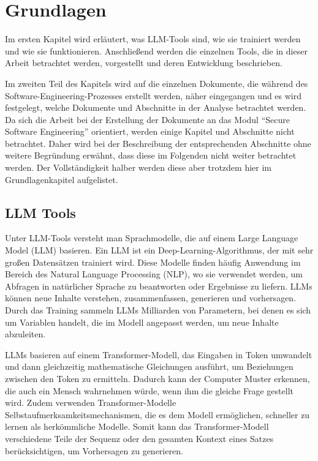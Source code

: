 
\chapter{Grundlagen} 

Im ersten Kapitel wird erläutert, was LLM-Tools sind, wie sie trainiert werden und wie sie funktionieren. 
Anschließend werden die einzelnen Tools, die in dieser Arbeit betrachtet werden, vorgestellt und deren 
Entwicklung beschrieben.

Im zweiten Teil des Kapitels wird auf die einzelnen Dokumente, die während des Software-Engineering-Prozesses 
erstellt werden, näher eingegangen und es wird festgelegt, welche Dokumente und Abschnitte in der Analyse betrachtet 
werden. Da sich die Arbeit bei der Erstellung der Dokumente an das Modul ``Secure Software Engineering'' orientiert, 
werden einige Kapitel und Abschnitte nicht betrachtet. Daher wird bei der Beschreibung der entsprechenden Abschnitte ohne 
weitere Begründung erwähnt, dass diese im Folgenden nicht weiter betrachtet werden. Der Vollständigkeit halber werden 
diese aber trotzdem hier im Grundlagenkapitel aufgelistet.

\section{LLM Tools}  \label{LLM Tools}

Unter LLM-Tools versteht man Sprachmodelle, die auf einem Large Language Model (LLM) basieren. Ein LLM ist ein 
Deep-Learning-Algorithmus, der mit sehr großen Datensätzen trainiert wird. Diese Modelle finden häufig Anwendung 
im Bereich des Natural Language Processing (NLP), wo sie verwendet werden, um Abfragen in natürlicher Sprache zu 
beantworten oder Ergebnisse zu liefern. LLMs können neue Inhalte verstehen, zusammenfassen, generieren und vorhersagen. 
Durch das Training sammeln LLMs Milliarden von Parametern, bei denen es sich um Variablen handelt, die im Modell angepasst 
werden, um neue Inhalte abzuleiten.

LLMs basieren auf einem Transformer-Modell, das Eingaben in Token umwandelt und dann gleichzeitig mathematische 
Gleichungen ausführt, um Beziehungen zwischen den Token zu ermitteln. Dadurch kann der Computer Muster erkennen, 
die auch ein Mensch wahrnehmen würde, wenn ihm die gleiche Frage gestellt wird. Zudem verwenden Transformer-Modelle 
Selbstaufmerksamkeitsmechanismen, die es dem Modell ermöglichen, schneller zu lernen als herkömmliche Modelle. Somit 
kann das Transformer-Modell verschiedene Teile der Sequenz oder den gesamten Kontext eines Satzes berücksichtigen, um 
Vorhersagen zu generieren.

